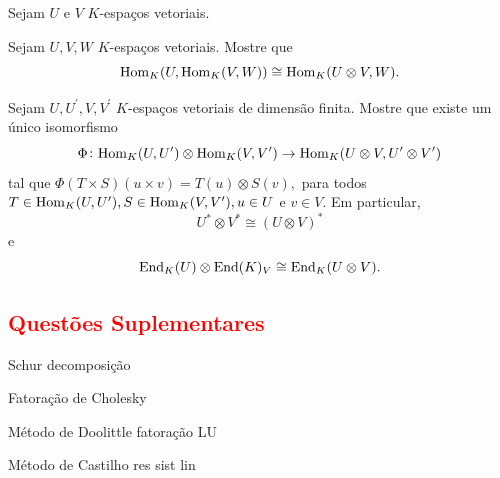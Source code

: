 \documentclass[11pt,a4paper]{article}
\begin{document}
\solucao{}
\begin{exercicio}
Sejam $U$ e $V$ $K$-espaços vetoriais.
\end{exercicio}
\solucao{}
\begin{exercicio}
Sejam $U, V, W$ $K$-espaços vetoriais. Mostre que
\[
\mathrm{Hom }_K(U, \mathrm{Hom }_K(V,W)) \cong \mathrm{Hom }_K(U \otimes V,W).
\]
\end{exercicio}
\solucao{}

\begin{exercicio}
Sejam $U, U^{\prime}, V, V^{\prime}$ $K$-espaços vetoriais de dimensão finita. Mostre que existe um único isomorfismo
\[
\Phi \colon \mathrm{Hom }_K(U, U^{\prime}) \otimes  \mathrm{Hom }_K(V, V^{\prime}) \to \mathrm{Hom }_K(U \otimes V, U^{\prime} \otimes V^{\prime})
\]
tal que $\Phi(T \times S)(u \times v) = T(u) \otimes S(v),$ para todos $T \in \mathrm{Hom }_K(U, U^{\prime}), S \in \mathrm{Hom }_K(V, V^{\prime}), u \in U$ e $v \in V.$ Em particular, 
\[
U^{*} \otimes V^{*} \cong (U \otimes V)^{*}
\]
e
\[
\mathrm{End }_K(U) \otimes \mathrm{End }(K)_V \cong \mathrm{End }_K(U \otimes V).
\]
\end{exercicio}
\solucao{}

\subsection*{\textcolor{Red}{Questões Suplementares}}

\begin{exercicio}
\end{exercicio}
\solucao{}

\begin{exercicio}
Schur decomposição %
\end{exercicio}
\solucao{}

\begin{exercicio}
Fatoração de Cholesky %
\end{exercicio}
\solucao{}

\begin{exercicio}
Método de Doolittle fatoração LU %
\end{exercicio}
\solucao{}
\begin{exercicio}
Método de Castilho res sist lin
\end{exercicio}
\solucao{}
\end{document}
